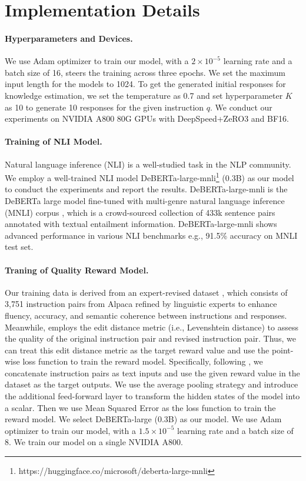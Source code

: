\section{Implementation Details}
\label{appendix:id}

\paragraph{Hyperparameters and Devices.}
We use Adam optimizer \citep{kingma2017adammethodstochasticoptimization} to train our model, with a $2\times10^{-5}$ learning rate and a batch size of 16, steers the training across three epochs.
We set the maximum input length for the models to 1024. 
To get the generated initial responses for knowledge estimation, we set the temperature as 0.7 and set hyperparameter $K$ as 10 to generate 10 responses for the given instruction $q$.
We conduct our experiments on NVIDIA A800 80G GPUs with DeepSpeed+ZeRO3 and BF16.

\paragraph{Training of NLI Model.}
Natural language inference (NLI) is a well-studied task in the NLP community.
We employ a well-trained NLI model DeBERTa-large-mnli\footnote{https://huggingface.co/microsoft/deberta-large-mnli} \citep{he2021deberta} (0.3B) as our model to conduct the experiments and report the results.
DeBERTa-large-mnli is the DeBERTa large model fine-tuned with multi-genre natural language inference (MNLI) corpus \citep{N18-1101}, which is a crowd-sourced collection of 433k sentence pairs annotated with textual entailment information.
DeBERTa-large-mnli shows advanced performance in various NLI benchmarks e.g., 91.5\% accuracy on MNLI test set.


\paragraph{Traning of Quality Reward Model.}
Our training data is derived from an expert-revised dataset \citep{DBLP:conf/icde/LiuTZZMZ0HZZMZY24}, which consists of 3,751 instruction pairs from Alpaca refined by linguistic experts to enhance fluency, accuracy, and semantic coherence between instructions and responses.
Meanwhile, \citet{DBLP:conf/icde/LiuTZZMZ0HZZMZY24} employs the edit distance metric (i.e., Levenshtein distance) to assess the quality of the original instruction pair and revised instruction pair.
Thus, we can treat this edit distance metric as the target reward value and use the point-wise loss function to train the reward model.
Specifically, following \citet{ge2024clustering}, we concatenate instruction pairs as text inputs and use the given reward value in the dataset as the target outputs.
We use the average pooling strategy and introduce the additional feed-forward layer to transform the hidden states of the model into a scalar.
Then we use Mean Squared Error as the loss function to train the reward model.
We select DeBERTa-large \citep{he2021deberta} (0.3B) as our model.
We use Adam optimizer to train our model, with a $1.5\times10^{-5}$ learning rate and a batch size of 8.
We train our model on a single NVIDIA A800.

